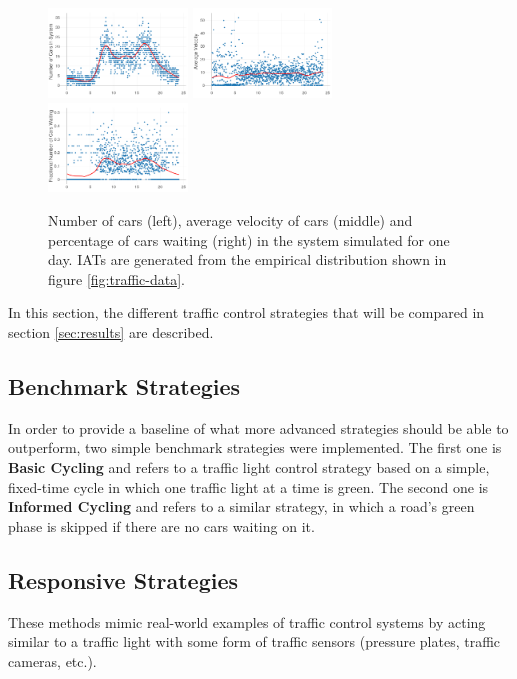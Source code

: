 \documentclass[11pt]{article}
\begin{document}
\begin{figure}[htb]
	\includegraphics[width=0.33\textwidth]{img/number_of_cars_over_day.png}
	\includegraphics[width=0.33\textwidth]{img/velocity_over_day.png}
	\includegraphics[width=0.33\textwidth]{img/frac_time_waitin.png}
	\caption{Number of cars (left), average velocity of cars (middle) and percentage of cars waiting (right) in the system simulated for one day. IATs are generated from the empirical distribution shown in figure \ref{fig:traffic-data}. \label{fig:validation}}
\end{figure}

\label{sec:strategies}
In this section, the different traffic control strategies that will be compared in section \ref{sec:results} are described.

\subsection{Benchmark Strategies} 
In order to provide a baseline of what more advanced strategies should be able to outperform, two simple benchmark strategies were implemented. The first one is \textbf{Basic Cycling} and refers to a traffic light control strategy based on a simple, fixed-time cycle in which one traffic light at a time is green. The second one is \textbf{Informed Cycling} and refers to a similar strategy, in which a road's green phase is skipped if there are no cars waiting on it.

\subsection{Responsive Strategies}
\label{sec:responsive}
These methods mimic real-world examples of traffic control systems by acting similar to a traffic light with some form of traffic sensors (pressure plates, traffic cameras, etc.). 
\end{document}
